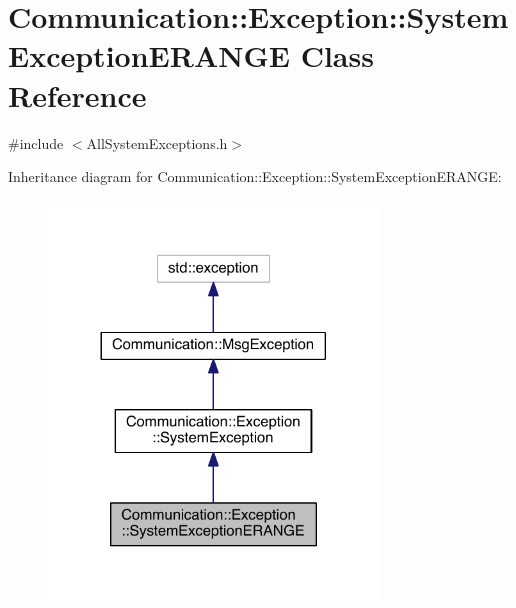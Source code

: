\hypertarget{class_communication_1_1_exception_1_1_system_exception_e_r_a_n_g_e}{}\section{Communication\+:\+:Exception\+:\+:System\+Exception\+E\+R\+A\+N\+G\+E Class Reference}
\label{class_communication_1_1_exception_1_1_system_exception_e_r_a_n_g_e}


{\ttfamily \#include $<$All\+System\+Exceptions.\+h$>$}



Inheritance diagram for Communication\+:\+:Exception\+:\+:System\+Exception\+E\+R\+A\+N\+G\+E\+:\nopagebreak
\begin{figure}[H]
\begin{center}
\leavevmode
\includegraphics[width=248pt]{class_communication_1_1_exception_1_1_system_exception_e_r_a_n_g_e__inherit__graph}
\end{center}
\end{figure}


